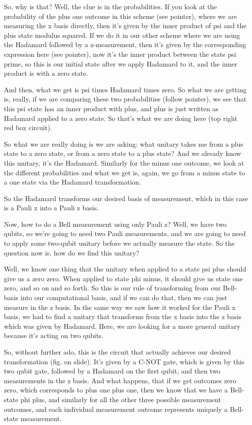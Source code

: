 So, why is that? Well, the clue is in the probabilities. If you look at the probability of the plus one outcome in this scheme (see pointer), where we are measuring the x basis directly, then it's given by the inner product of psi and the plus state modulus squared. If we do it in our other scheme where we are using the Hadamard followed by a z-measurement, then it's given by the corresponding expression here (see pointer), now it's the inner product between the state psi prime, so this is our initial state after we apply Hadamard to it, and the inner product is with a zero state.

And then, what we get is psi times Hadamard times zero. So what we are getting is, really, if we are comparing these two probabilities (follow pointer), we see that this psi state has an inner product with plus, and plus is just written as Hadamard applied to a zero state. So that's what we are doing here (top right red box circuit).

So what we are really doing is we are asking: what unitary takes me from a plus state to a zero state, or from a zero state to a plus state? And we already know this unitary, it's the Hadamard. Similarly for the minus one outcome, we look at the different probabilities and what we get is, again, we go from a minus state to a one state via the Hadamard transformation.

So the Hadamard transforms our desired basis of measurement, which in this case is a Pauli x into a Pauli z basis.

Now, how to do a Bell measurement using only Pauli z? Well, we have two qubits, so we're going to need two Pauli measurements, and we are going to need to apply some two-qubit unitary before we actually measure the state. So the question now is, how do we find this unitary?

Well, we know one thing that the unitary when applied to a state psi plus should give us a zero zero. When applied to state phi minus, it should give us state one zero, and so on and so forth. So this is our rule of transforming from our Bell-basis into our computational basis, and if we can do that, then we can just measure in the z basis. In the same way we saw how it worked for the Pauli x basis, we had to find a unitary that transforms from the x basis into the z basis which was given by Hadamard. Here, we are looking for a more general unitary because it's acting on two qubits.

So, without further ado, this is the circuit that actually achieves our desired transformation (fig. on slide). It's given by a C-NOT gate, which is given by this two qubit gate, followed by a Hadamard on the first qubit, and then two measurements in the z basis. And what happens, that if we get outcomes zero zero, which corresponds to plus one plus one, then we know that we have a Bell-state phi plus, and similarly for all the other three possible measurement outcomes, and each individual measurement outcome represents uniquely a Bell-state measurement.

